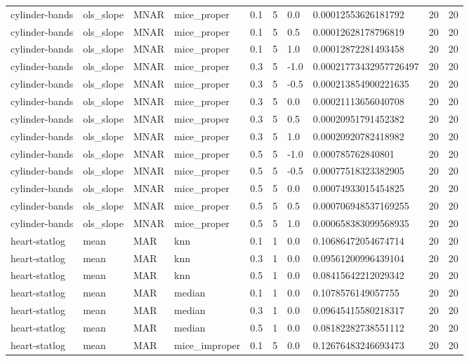 \begin{tabular}{llllllllll}
cylinder-bands & ols\_slope & MNAR & mice\_proper & 0.1 & 5 & 0.0 & 0.00012553626181792 & 20 & 20 \\
cylinder-bands & ols\_slope & MNAR & mice\_proper & 0.1 & 5 & 0.5 & 0.00012628178796819 & 20 & 20 \\
cylinder-bands & ols\_slope & MNAR & mice\_proper & 0.1 & 5 & 1.0 & 0.00012872281493458 & 20 & 20 \\
cylinder-bands & ols\_slope & MNAR & mice\_proper & 0.3 & 5 & -1.0 & 0.00021773432957726497 & 20 & 20 \\
cylinder-bands & ols\_slope & MNAR & mice\_proper & 0.3 & 5 & -0.5 & 0.000213854900221635 & 20 & 20 \\
cylinder-bands & ols\_slope & MNAR & mice\_proper & 0.3 & 5 & 0.0 & 0.00021113656040708 & 20 & 20 \\
cylinder-bands & ols\_slope & MNAR & mice\_proper & 0.3 & 5 & 0.5 & 0.00020951791452382 & 20 & 20 \\
cylinder-bands & ols\_slope & MNAR & mice\_proper & 0.3 & 5 & 1.0 & 0.00020920782418982 & 20 & 20 \\
cylinder-bands & ols\_slope & MNAR & mice\_proper & 0.5 & 5 & -1.0 & 0.000785762840801 & 20 & 20 \\
cylinder-bands & ols\_slope & MNAR & mice\_proper & 0.5 & 5 & -0.5 & 0.00077518323382905 & 20 & 20 \\
cylinder-bands & ols\_slope & MNAR & mice\_proper & 0.5 & 5 & 0.0 & 0.00074933015454825 & 20 & 20 \\
cylinder-bands & ols\_slope & MNAR & mice\_proper & 0.5 & 5 & 0.5 & 0.000706948537169255 & 20 & 20 \\
cylinder-bands & ols\_slope & MNAR & mice\_proper & 0.5 & 5 & 1.0 & 0.000658383099568935 & 20 & 20 \\
heart-statlog & mean & MAR & knn & 0.1 & 1 & 0.0 & 0.10686472054674714 & 20 & 20 \\
heart-statlog & mean & MAR & knn & 0.3 & 1 & 0.0 & 0.09561200996439104 & 20 & 20 \\
heart-statlog & mean & MAR & knn & 0.5 & 1 & 0.0 & 0.08415642212029342 & 20 & 20 \\
heart-statlog & mean & MAR & median & 0.1 & 1 & 0.0 & 0.1078576149057755 & 20 & 20 \\
heart-statlog & mean & MAR & median & 0.3 & 1 & 0.0 & 0.09645415580218317 & 20 & 20 \\
heart-statlog & mean & MAR & median & 0.5 & 1 & 0.0 & 0.08182282738551112 & 20 & 20 \\
heart-statlog & mean & MAR & mice\_improper & 0.1 & 5 & 0.0 & 0.12676483246693473 & 20 & 20 \\

\end{tabular}

